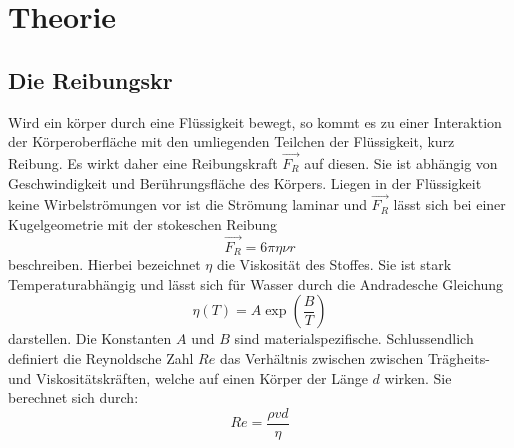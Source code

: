
\section{Theorie}
\label{sec:Theorie}
\subsection{Die Reibungskr}
Wird ein körper durch eine Flüssigkeit bewegt, so kommt es zu einer Interaktion
der Körperoberfläche mit den umliegenden Teilchen der Flüssigkeit, kurz Reibung.
 Es wirkt daher eine Reibungskraft $\vec{F_R}$ auf diesen. Sie ist abhängig von
Geschwindigkeit und Berührungsfläche des Körpers. Liegen in der Flüssigkeit
keine Wirbelströmungen vor ist die Strömung laminar und $\vec{F_R}$ lässt sich
bei einer Kugelgeometrie mit der stokeschen Reibung
\begin{equation}
  \vec{F_R} = 6 \pi \eta \nu r
  \end{equation}
  beschreiben. Hierbei bezeichnet $\eta$ die Viskosität des Stoffes. Sie ist
  stark Temperaturabhängig und lässt sich für Wasser durch die Andradesche
  Gleichung
  \begin{equation}
    \eta(T) = A \exp(\frac{B}{T})
    \end{equation}
darstellen. Die Konstanten $A$ und $B$ sind materialspezifische.
Schlussendlich definiert die Reynoldsche Zahl $Re$ das Verhältnis zwischen
zwischen Trägheits- und Viskositätskräften, welche auf einen Körper der Länge $d$
wirken. Sie berechnet sich durch:
\begin{equation}
  Re = \frac{\rho v d}{\eta}
  \end{equation}
